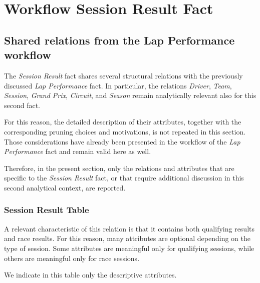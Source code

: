 \documentclass[a4paper,11pt]{article}
\begin{document}
	
	\section{Workflow Session Result Fact}
	
	\subsection{Shared relations from the Lap Performance workflow}
	
	The \textit{Session Result} fact shares several structural relations with the previously discussed \textit{Lap Performance} fact.
	In particular, the relations \textit{Driver}, \textit{Team}, \textit{Session}, \textit{Grand Prix}, \textit{Circuit}, and \textit{Season} remain analytically relevant also for this second fact.
	
	For this reason, the detailed description of their attributes, together with the corresponding pruning choices and motivations, is not repeated in this section.
	Those considerations have already been presented in the workflow of the \textit{Lap Performance} fact and remain valid here as well.
	
	Therefore, in the present section, only the relations and attributes that are specific to the \textit{Session Result} fact, or that require additional discussion in this second analytical context, are reported.
	

	
	\subsubsection{Session Result Table}
	
	A relevant characteristic of this relation is that it contains both qualifying results and
	race results. For this reason, many attributes are optional depending on the type of
	session. Some attributes are meaningful only for qualifying sessions, while others are
	meaningful only for race sessions.
	
	We indicate in this table only the descriptive attributes.
	
\end{document}
